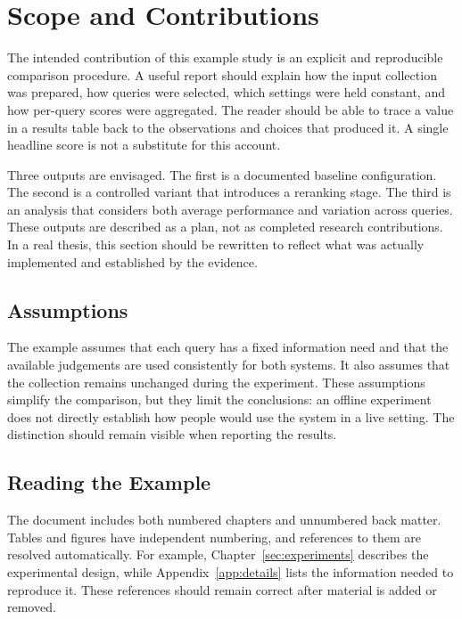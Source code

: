 \newpage
\section{Scope and Contributions}
\label{sec:scope}
The intended contribution of this example study is an explicit and reproducible
comparison procedure. A useful report should explain how the input collection
was prepared, how queries were selected, which settings were held constant,
and how per-query scores were aggregated. The reader should be able to trace
a value in a results table back to the observations and choices that produced
it. A single headline score is not a substitute for this account.

Three outputs are envisaged. The first is a documented baseline configuration.
The second is a controlled variant that introduces a reranking stage. The third
is an analysis that considers both average performance and variation across
queries. These outputs are described as a plan, not as completed research
contributions. In a real thesis, this section should be rewritten to reflect
what was actually implemented and established by the evidence.

\subsection{Assumptions}
The example assumes that each query has a fixed information need and that the
available judgements are used consistently for both systems. It also assumes
that the collection remains unchanged during the experiment. These assumptions
simplify the comparison, but they limit the conclusions: an offline experiment
does not directly establish how people would use the system in a live setting.
The distinction should remain visible when reporting the results.

\subsection{Reading the Example}
The document includes both numbered chapters and unnumbered back matter.
Tables and figures have independent numbering, and references to them are
resolved automatically. For example, Chapter~\ref{sec:experiments} describes the
experimental design, while Appendix~\ref{app:details} lists the information
needed to reproduce it. These references should remain correct after material
is added or removed.

\newpage
